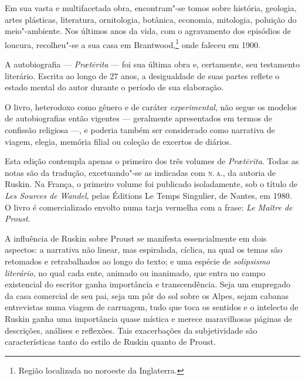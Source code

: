 Em sua vasta e multifacetada obra, encontram"-se tomos sobre história,
geologia, artes plásticas, literatura, ornitologia, botânica, economia,
mitologia, poluição do meio"-ambiente. Nos últimos anos da vida, com o
agravamento dos episódios de loucura, recolheu"-se a sua casa em
Brantwood,\footnote{Região localizada no noroeste da Inglaterra.} onde faleceu em 1900.

A autobiografia --- \textit{Pr\ae tērita} --- foi sua última obra e,
certamente, seu testamento literário. Escrita ao longo de 27 anos, a
desigualdade de suas partes reflete o estado mental do autor durante o
período de sua elaboração.

O livro, heterodoxo como gênero e de caráter \textit{experimental}, não segue
os modelos de autobiografias então vigentes --- geralmente apresentados
em termos de confissão religiosa ---, e poderia também ser considerado
como narrativa de viagem, elegia, memória filial ou coleção de excertos
de diários.

Esta edição contempla apenas o primeiro dos três volumes de
\textit{Pr\ae tērita}. Todas as notas são da tradução, excetuando"-se as indicadas com \textsc{n.\,a.}, da autoria de Ruskin.  Na França, o primeiro volume foi publicado
isoladamente, sob o título de \textit{Les Sources de Wandel}, pelas Éditions Le
Temps Singulier, de Nantes, em 1980. O livro é comercializado envolto numa
tarja vermelha com a frase: \textit{Le Maître de Proust}.


A influência de Ruskin sobre Proust se manifesta essencialmente em dois
aspectos: a narrativa não linear, mas espiralada, cíclica, na qual os
temas são retomados e retrabalhados ao longo do texto; e uma espécie de
\textit{solipsismo literário}, no qual cada ente, animado ou inanimado, que
entra no campo existencial do escritor ganha importância e
transcendência. Seja um empregado da casa comercial de seu pai, seja um
pôr do sol sobre os Alpes, sejam cabanas entrevistas numa viagem de
carruagem, tudo que toca os sentidos e o intelecto de Ruskin ganha uma
importância quase mística e merece maravilhosas páginas de descrições,
análises e reflexões. Tais exacerbações da subjetividade são
características tanto do estilo de Ruskin quanto de Proust.

